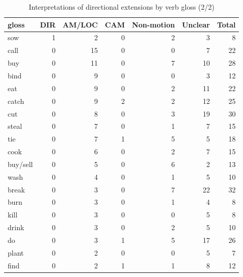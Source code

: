 \begin{table}
	\caption{Interpretations of directional extensions by verb gloss (2/2)}
	\label{tab:interpretation2}
	\begin{tabular}{lrrrrrr} %
		\lsptoprule
		gloss &   DIR &  AM/LOC &   CAM &  Non-motion &  Unclear &  Total \\
		\midrule
sow         &    1 &             2 &    0 &           2 &        3 &      8 \\
call        &    0 &            15 &    0 &           0 &        7 &     22 \\
buy         &    0 &            11 &    0 &           7 &       10 &     28 \\
bind        &    0 &             9 &    0 &           0 &        3 &     12 \\
eat         &    0 &             9 &    0 &           2 &       11 &     22 \\
catch       &    0 &             9 &    2 &           2 &       12 &     25 \\
cut         &    0 &             8 &    0 &           3 &       19 &     30 \\
steal       &    0 &             7 &    0 &           1 &        7 &     15 \\
tie         &    0 &             7 &    1 &           5 &        5 &     18 \\
cook        &    0 &             6 &    0 &           2 &        7 &     15 \\
buy/sell    &    0 &             5 &    0 &           6 &        2 &     13 \\
wash        &    0 &             4 &    0 &           1 &        5 &     10 \\
break       &    0 &             3 &    0 &           7 &       22 &     32 \\
burn        &    0 &             3 &    0 &           1 &        4 &      8 \\
kill        &    0 &             3 &    0 &           0 &        5 &      8 \\
drink       &    0 &             3 &    0 &           2 &        5 &     10 \\
do          &    0 &             3 &    1 &           5 &       17 &     26 \\
plant       &    0 &             2 &    0 &           0 &        5 &      7 \\
find        &    0 &             2 &    1 &           1 &        8 &     12 \\

\end{tabular}
\end{table}
